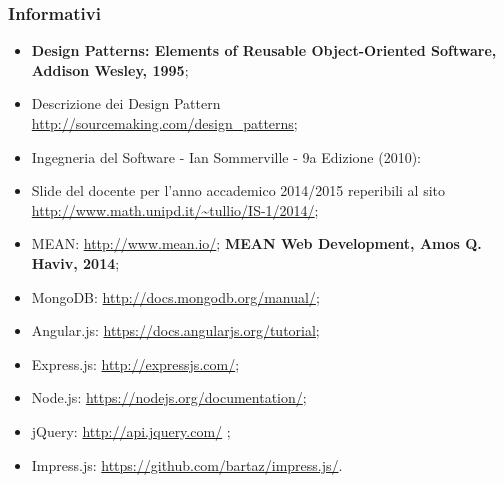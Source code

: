 \subsubsection{Informativi}
\begin{itemize}
\item \textbf{Design Patterns: Elements of Reusable Object-Oriented Software, Addison Wesley, 1995};
\item Descrizione dei Design Pattern\\
\url{http://sourcemaking.com/design_patterns};
\item Ingegneria del Software - Ian Sommerville - 9a Edizione (2010):
\item Slide del docente per l'anno accademico 2014/2015 reperibili al sito \\
\url{http://www.math.unipd.it/~tullio/IS-1/2014/};
\item MEAN: \url{http://www.mean.io/}; \textbf{MEAN Web Development, Amos Q. Haviv, 2014}; 
\item MongoDB: \url{http://docs.mongodb.org/manual/};
\item Angular.js: \url{https://docs.angularjs.org/tutorial};
\item Express.js: \url{http://expressjs.com/};
\item Node.js: \url{https://nodejs.org/documentation/};
\item jQuery: \url{http://api.jquery.com/} ;
\item Impress.js: \url{https://github.com/bartaz/impress.js/}.

\end{itemize}
